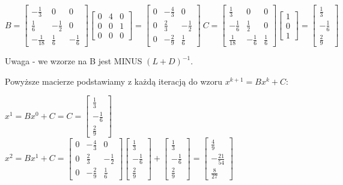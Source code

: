 \documentclass{article}
\begin{document}
$
B = 
\begin{bmatrix}
    -\frac{1}{3} & 0 & 0 \\
    \frac{1}{6} & -\frac{1}{2} & 0 \\
    -\frac{1}{18} & \frac{1}{6} & -\frac{1}{6}
\end{bmatrix}
\begin{bmatrix}
    0 & 4 & 0 \\
    0 & 0 & 1 \\
    0 & 0 & 0 
\end{bmatrix} 
= 
\begin{bmatrix}
    0 & -\frac{4}{3} & 0 \\
    0 & \frac{2}{3} & -\frac{1}{2} \\
    0 & -\frac{2}{9} & \frac{1}{6} 
\end{bmatrix} 
\
C = 
\begin{bmatrix}
    \frac{1}{3} & 0 & 0 \\
    -\frac{1}{6} & \frac{1}{2} & 0 \\
    \frac{1}{18} & -\frac{1}{6} & \frac{1}{6}
\end{bmatrix}
\begin{bmatrix}
    1\\0\\1
\end{bmatrix}
=
\begin{bmatrix}
    \frac{1}{3}\\-\frac{1}{6}\\\frac{2}{9}
\end{bmatrix}
$

Uwaga - we wzorze na B jest MINUS $(L+D)^{-1}$.

Powyższe macierze podstawiamy z każdą iteracją do wzoru $x^{k+1} = Bx^k + C$:

$x^1 = Bx^0 + C = C = \begin{bmatrix}\frac{1}{3}\\-\frac{1}{6}\\\frac{2}{9}\end{bmatrix} $ \\
$x^2 = Bx^1 + C = 
\begin{bmatrix}0 & -\frac{4}{3} & 0 \\0 & \frac{2}{3} & -\frac{1}{2} \\0 & -\frac{2}{9} & \frac{1}{6}\end{bmatrix}
\begin{bmatrix}\frac{1}{3}\\-\frac{1}{6}\\\frac{2}{9}\end{bmatrix}
+ \begin{bmatrix}\frac{1}{3}\\-\frac{1}{6}\\\frac{2}{9}\end{bmatrix}  = \begin{bmatrix}\frac{4}{9}\\-\frac{21}{54}\\\frac{8}{27}\end{bmatrix}$
\end{document}
